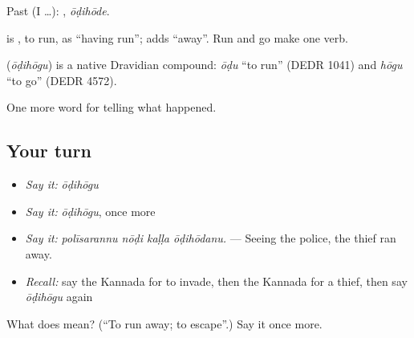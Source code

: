 Past (I …): , \emph{ōḍihōde}.

 is , to run, as \textquotedblleft{}having run\textquotedblright{};  adds \textquotedblleft{}away\textquotedblright{}. Run and go make one verb.

\begin{cousinweb}
\textbf{} (\emph{ōḍihōgu}) is a native Dravidian compound: \emph{ōḍu} \textquotedblleft{}to run\textquotedblright{} (DEDR 1041) and \emph{hōgu} \textquotedblleft{}to go\textquotedblright{} (DEDR 4572).
\end{cousinweb}

\begin{grammarlens}[title={What you've built}]
One more word for telling what happened.
\end{grammarlens}

\subsection*{Your turn}
\begin{itemize}
\raggedright
  \item \emph{Say it:} \emph{ōḍihōgu}
  \item \emph{Say it:} \emph{ōḍihōgu}, once more
  \item \emph{Say it:} \emph{polīsarannu nōḍi kaḷḷa ōḍihōdanu.} — Seeing the police, the thief ran away.
  \item \emph{Recall:} say the Kannada for to invade, then the Kannada for a thief, then say \emph{ōḍihōgu} again
\end{itemize}

\begin{tcolorbox}[breakable,colback=teal!4,colframe=teal!35!black,title={Before you move on}]
What does  mean? (\textquotedblleft{}To run away; to escape\textquotedblright{}.) Say it once more.
\end{tcolorbox}
